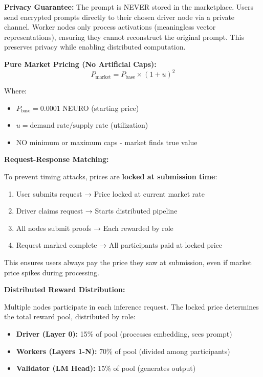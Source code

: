 \documentclass[11pt,a4paper]{article}
\begin{document}
\textbf{Privacy Guarantee:} The prompt is NEVER stored in the marketplace. Users send encrypted prompts directly to their chosen driver node via a private channel. Worker nodes only process activations (meaningless vector representations), ensuring they cannot reconstruct the original prompt. This preserves privacy while enabling distributed computation.

\textbf{Pure Market Pricing (No Artificial Caps):}
\begin{equation}
P_{\text{market}} = P_{\text{base}} \times (1 + u)^2
\end{equation}

Where:
\begin{itemize}
    \item $P_{\text{base}} = 0.0001$ NEURO (starting price)
    \item $u = \text{demand rate} / \text{supply rate}$ (utilization)
    \item NO minimum or maximum caps - market finds true value
\end{itemize}

\textbf{Request-Response Matching:}

To prevent timing attacks, prices are \textbf{locked at submission time}:
\begin{enumerate}
    \item User submits request → Price locked at current market rate
    \item Driver claims request → Starts distributed pipeline
    \item All nodes submit proofs → Each rewarded by role
    \item Request marked complete → All participants paid at locked price
\end{enumerate}

This ensures users always pay the price they saw at submission, even if market price spikes during processing.

\textbf{Distributed Reward Distribution:}

Multiple nodes participate in each inference request. The locked price determines the total reward pool, distributed by role:
\begin{itemize}
    \item \textbf{Driver (Layer 0):} 15\% of pool (processes embedding, sees prompt)
    \item \textbf{Workers (Layers 1-N):} 70\% of pool (divided among participants)
    \item \textbf{Validator (LM Head):} 15\% of pool (generates output)
\end{itemize}
\end{document}
